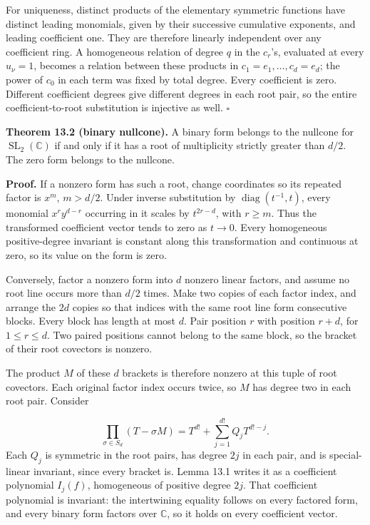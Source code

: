 \documentclass[
]{article}
\begin{document}
For uniqueness, distinct products of the elementary symmetric functions
have distinct leading monomials, given by their successive cumulative
exponents, and leading coefficient one. They are therefore linearly
independent over any coefficient ring. A homogeneous relation of degree
\(q\) in the \(c_r\)'s, evaluated at every \(u_\nu=1\), becomes a
relation between these products in \(c_1=e_1,\ldots,c_d=e_d\); the power
of \(c_0\) in each term was fixed by total degree. Every coefficient is
zero. Different coefficient degrees give different degrees in each root
pair, so the entire coefficient-to-root substitution is injective as
well. \(\square\)

\protect{}\label{theorem-13-2}{}

\textbf{Theorem 13.2 (binary nullcone).} A binary form belongs to the
nullcone for \(\operatorname{SL}_2(\mathbb C)\) if and only if it has a
root of multiplicity strictly greater than \(d/2\). The zero form
belongs to the nullcone.

\textbf{Proof.} If a nonzero form has such a root, change coordinates so
its repeated factor is \(x^m\), \(m>d/2\). Under inverse substitution by
\(\operatorname{diag}(t^{-1},t)\), every monomial \(x^ry^{d-r}\)
occurring in it scales by \(t^{2r-d}\), with \(r\geq m\). Thus the
transformed coefficient vector tends to zero as \(t\to0\). Every
homogeneous positive-degree invariant is constant along this
transformation and continuous at zero, so its value on the form is zero.

Conversely, factor a nonzero form into \(d\) nonzero linear factors, and
assume no root line occurs more than \(d/2\) times. Make two copies of
each factor index, and arrange the \(2d\) copies so that indices with
the same root line form consecutive blocks. Every block has length at
most \(d\). Pair position \(r\) with position \(r+d\), for
\(1\leq r\leq d\). Two paired positions cannot belong to the same block,
so the bracket of their root covectors is nonzero.

The product \(M\) of these \(d\) brackets is therefore nonzero at this
tuple of root covectors. Each original factor index occurs twice, so
\(M\) has degree two in each root pair. Consider
\protect{}\label{equation-H4}{}

\[
\prod_{\sigma\in S_d}(T-\sigma M)
=T^{d!}+\sum_{j=1}^{d!}Q_jT^{d!-j}.
\tag{H4}
\] Each \(Q_j\) is symmetric in the root pairs, has degree \(2j\) in
each pair, and is special-linear invariant, since every bracket is.
Lemma 13.1 writes it as a coefficient polynomial \(I_j(f)\), homogeneous
of positive degree \(2j\). That coefficient polynomial is invariant: the
intertwining equality follows on every factored form, and every binary
form factors over \(\mathbb C\), so it holds on every coefficient
vector.
\end{document}
